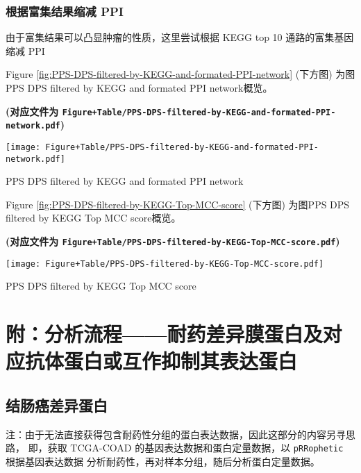 \documentclass[
]{article}
\begin{document}
\hypertarget{cut-ppi}{%
\subsubsection{根据富集结果缩减 PPI}\label{cut-ppi}}

由于富集结果可以凸显肿瘤的性质，这里尝试根据 KEGG top 10 通路的富集基因缩减 PPI

Figure \ref{fig:PPS-DPS-filtered-by-KEGG-and-formated-PPI-network} (下方图) 为图PPS DPS filtered by KEGG and formated PPI network概览。

\textbf{(对应文件为 \texttt{Figure+Table/PPS-DPS-filtered-by-KEGG-and-formated-PPI-network.pdf})}

\def\@captype{figure}
\begin{center}
\texttt{[image: Figure+Table/PPS-DPS-filtered-by-KEGG-and-formated-PPI-network.pdf]}
\caption{PPS DPS filtered by KEGG and formated PPI network}\label{fig:PPS-DPS-filtered-by-KEGG-and-formated-PPI-network}
\end{center}

Figure \ref{fig:PPS-DPS-filtered-by-KEGG-Top-MCC-score} (下方图) 为图PPS DPS filtered by KEGG Top MCC score概览。

\textbf{(对应文件为 \texttt{Figure+Table/PPS-DPS-filtered-by-KEGG-Top-MCC-score.pdf})}

\def\@captype{figure}
\begin{center}
\texttt{[image: Figure+Table/PPS-DPS-filtered-by-KEGG-Top-MCC-score.pdf]}
\caption{PPS DPS filtered by KEGG Top MCC score}\label{fig:PPS-DPS-filtered-by-KEGG-Top-MCC-score}
\end{center}

\hypertarget{workflow2}{%
\section{附：分析流程------耐药差异膜蛋白及对应抗体蛋白或互作抑制其表达蛋白}\label{workflow2}}

\hypertarget{ux7ed3ux80a0ux764cux5deeux5f02ux86cbux767d}{%
\subsection{结肠癌差异蛋白}\label{ux7ed3ux80a0ux764cux5deeux5f02ux86cbux767d}}

注：由于无法直接获得包含耐药性分组的蛋白表达数据，因此这部分的内容另寻思路，
即，获取 TCGA-COAD 的基因表达数据和蛋白定量数据，以 \texttt{pRRophetic} 根据基因表达数据
分析耐药性，再对样本分组，随后分析蛋白定量数据。
\end{document}
